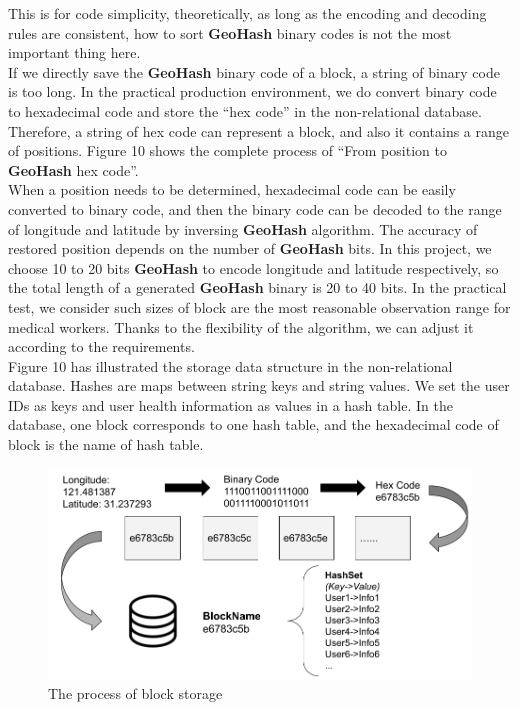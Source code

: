 \documentclass[sigplan,screen]{acmart}
\begin{document}
This is for code simplicity, theoretically, as long as the encoding and decoding rules are consistent, how to sort \textbf{GeoHash} binary codes is not the most important thing here.
\\
If we directly save the \textbf{GeoHash} binary code of a block, a string of binary code is too long.
In the practical production environment, we do convert binary code to hexadecimal code and store the ``hex code'' in the non-relational database.
Therefore, a string of hex code can represent a block, and also it contains a range of positions.
Figure 10 shows the complete process of ``From position to \textbf{GeoHash} hex code''.
\\
When a position needs to be determined, hexadecimal code can be easily converted to binary code, and then the binary code can be decoded to the range of longitude and latitude by inversing \textbf{GeoHash} algorithm.
The accuracy of restored position depends on the number of \textbf{GeoHash} bits.
In this project, we choose 10 to 20 bits \textbf{GeoHash} to encode longitude and latitude respectively, so the total length of a generated \textbf{GeoHash} binary is 20 to 40 bits.
In the practical test, we consider such sizes of block are the most reasonable observation range for medical workers.
Thanks to the flexibility of the algorithm, we can adjust it according to the requirements.
\\
Figure 10 has illustrated the storage data structure in the non-relational database.
Hashes are maps between string keys and string values.
We set the user IDs as keys and user health information as values in a hash table.
In the database, one block corresponds to one hash table, and the hexadecimal code of block is the name of hash table.
\begin{figure}[htb]
	\centering\includegraphics[width=\linewidth]{block-storage.png}
	\caption{The process of block storage}
\end{figure}
\end{document}
